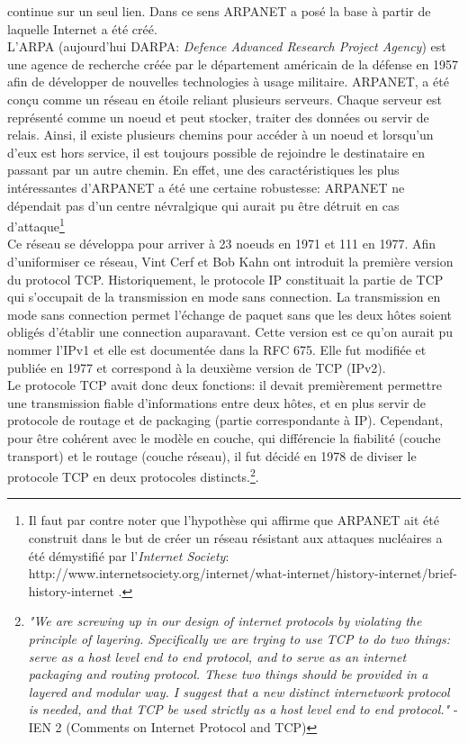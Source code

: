 continue sur un seul lien. Dans ce sens ARPANET a posé la base à partir de 
laquelle Internet a été créé. 
\\
L'ARPA (aujourd'hui DARPA: {\it Defence Advanced Research Project Agency}) est
une agence de recherche créée par le département américain de la défense en
1957 afin de développer de nouvelles technologies à usage militaire. ARPANET,
a été conçu comme un réseau en étoile reliant plusieurs serveurs.
Chaque serveur est représenté comme un noeud et peut stocker, traiter des données ou servir de relais.
Ainsi, il existe plusieurs chemins pour accéder à un noeud et lorsqu'un d'eux
est hors service, il est toujours possible de rejoindre le destinataire
en passant par un autre chemin. En effet, une des caractéristiques les plus intéressantes
d'ARPANET a été une certaine robustesse: ARPANET ne dépendait pas d'un centre
névralgique qui aurait pu être détruit en cas d'attaque\footnote { Il faut par
contre noter que l'hypothèse qui affirme que ARPANET ait été construit dans le
but de créer un réseau résistant aux attaques nucléaires a été démystifié par
l'{\it Internet Society}:
http://www.internetsociety.org/internet/what-internet/history-internet/brief-history-internet
.}
\\
Ce réseau se développa pour arriver à 23 noeuds en 1971 et 111 en 1977.
Afin d'uniformiser ce réseau, Vint Cerf et Bob Kahn ont introduit la première
version du protocol TCP.  Historiquement, le protocole IP constituait la
partie de TCP qui s'occupait de la transmission en mode sans connection.
La transmission en mode sans connection permet l'échange de paquet sans que les
deux hôtes soient obligés d'établir une connection auparavant.
Cette version est ce qu'on aurait pu nommer l'IPv1 et elle est documentée dans
la RFC 675. Elle fut modifiée et publiée en 1977 et correspond à la
deuxième version de TCP (IPv2). 
\\
Le protocole TCP avait donc deux fonctions: il devait premièrement
permettre une transmission fiable d'informations entre deux hôtes, et en plus
servir de protocole de routage et de packaging (partie correspondante à IP).
Cependant, pour être cohérent avec le modèle en couche, qui différencie la fiabilité
(couche transport) et le routage (couche réseau), il fut décidé en 1978 de
diviser le protocole TCP en deux protocoles distincts.\footnote {
{\it "We are screwing up in our design of internet protocols by violating the
principle of layering. Specifically we are trying to use TCP to do two
things: serve as a host level end to end protocol, and to serve as an
internet packaging and routing protocol. These two things should be
provided in a layered and modular way. I suggest that a new distinct
internetwork protocol is needed, and that TCP be used strictly as a host
level end to end protocol." } - IEN 2 (Comments on Internet Protocol and TCP)
}.

